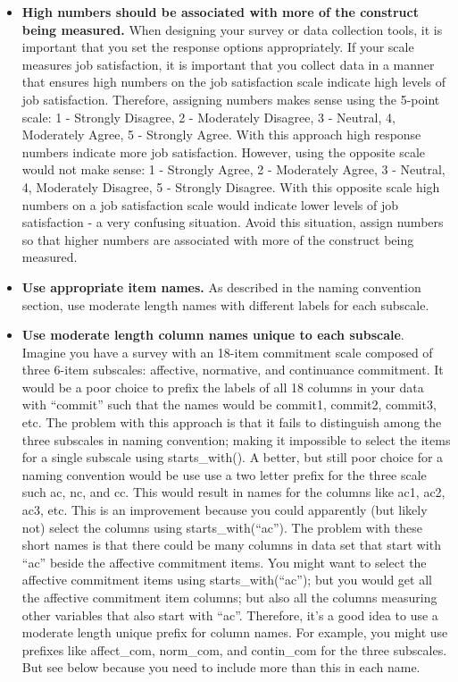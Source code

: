 \documentclass[
]{krantz}
\begin{document}
\begin{itemize}
\item
  \textbf{High numbers should be associated with more of the construct being measured.} When designing your survey or data collection tools, it is important that you set the response options appropriately. If your scale measures job satisfaction, it is important that you collect data in a manner that ensures high numbers on the job satisfaction scale indicate high levels of job satisfaction. Therefore, assigning numbers makes sense using the 5-point scale: 1 - Strongly Disagree, 2 - Moderately Disagree, 3 - Neutral, 4, Moderately Agree, 5 - Strongly Agree. With this approach high response numbers indicate more job satisfaction. However, using the opposite scale would not make sense: 1 - Strongly Agree, 2 - Moderately Agree, 3 - Neutral, 4, Moderately Disagree, 5 - Strongly Disagree. With this opposite scale high numbers on a job satisfaction scale would indicate lower levels of job satisfaction - a very confusing situation. Avoid this situation, assign numbers so that higher numbers are associated with more of the construct being measured.
\item
  \textbf{Use appropriate item names.} As described in the naming convention section, use moderate length names with different labels for each subscale.
\item
  \textbf{Use moderate length column names unique to each subscale}. Imagine you have a survey with an 18-item commitment scale \citep{meyer1993commitment} composed of three 6-item subscales: affective, normative, and continuance commitment. It would be a poor choice to prefix the labels of all 18 columns in your data with ``commit'' such that the names would be commit1, commit2, commit3, etc. The problem with this approach is that it fails to distinguish among the three subscales in naming convention; making it impossible to select the items for a single subscale using starts\_with(). A better, but still poor choice for a naming convention would be use use a two letter prefix for the three scale such ac, nc, and cc. This would result in names for the columns like ac1, ac2, ac3, etc. This is an improvement because you could apparently (but likely not) select the columns using starts\_with(``ac''). The problem with these short names is that there could be many columns in data set that start with ``ac'' beside the affective commitment items. You might want to select the affective commitment items using starts\_with(``ac''); but you would get all the affective commitment item columns; but also all the columns measuring other variables that also start with ``ac''. Therefore, it's a good idea to use a moderate length unique prefix for column names. For example, you might use prefixes like affect\_com, norm\_com, and contin\_com for the three subscales. But see below because you need to include more than this in each name.

\end{itemize}
\end{document}
